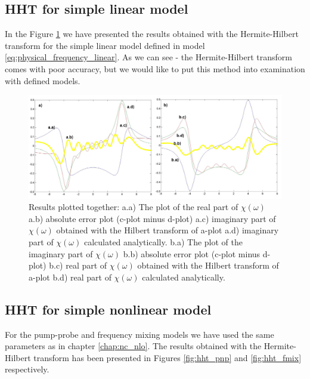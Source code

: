 \documentclass[12pt,twoside,a4paper]{article}
\numberwithin{equation}{subsection}
\numberwithin{figure}{subsection}
\begin{document}
\subsection{HHT for simple linear model} \label{chap:hermite_lin}

In the Figure \ref{fig:hht_lin} we have presented the results obtained with the Hermite-Hilbert transform for the simple
linear model defined in model \ref{eq:physical_frequency_linear}. As we can see - the Hermite-Hilbert transform comes with poor accuracy, but we
would like to put this method into examination with defined models.

\begin{figure} 
  \includegraphics[width=150mm]{img/hht_lin.png}
  \caption{Results plotted together: 
   a.a) The plot of the real part of $\chi (\omega )$ 
   a.b) absolute error plot (c-plot minus d-plot) 
   a.c) imaginary part of $\chi (\omega )$ obtained with the Hilbert transform of a-plot 
   a.d) imaginary part of $\chi (\omega )$  calculated analytically. 
   b.a) The plot of the imaginary part of $\chi (\omega )$ 
   b.b) absolute error plot (c-plot minus d-plot) 
   b.c) real part of $\chi (\omega )$ obtained with the Hilbert transform of a-plot 
   b.d) real part of $\chi (\omega )$ calculated analytically. \label{fig:hht_lin}
  }
\end{figure}

\subsection{HHT for simple nonlinear model} \label{chap:hermite_nlo}

For the pump-probe and frequency mixing models we have used the same parameters as in chapter \ref{chap:nc_nlo}. The results
obtained with the Hermite-Hilbert transform has been presented in Figures \ref{fig:hht_pnp} and \ref{fig:hht_fmix}
respectively.
\end{document}
